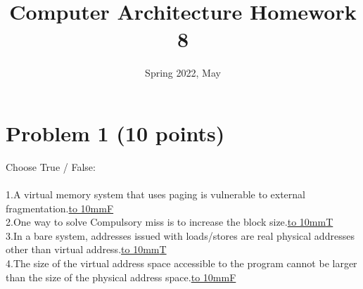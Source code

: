 \documentclass[answers]{exam}
\title{Computer Architecture Homework 8}
\date{Spring 2022, May}
\begin{document}
\maketitle

\section*{Problem 1 (10 points) }
Choose True / False:\\
\\1.A virtual memory system that uses paging is vulnerable to external fragmentation.\underline{\hbox to 10mm{F}}
\\2.One way to solve Compulsory miss is to increase the block size.\underline{\hbox to 10mm{T}}
\\3.In a bare system, addresses issued with loads/stores are real physical addresses other than virtual address.\underline{\hbox to 10mm{T}}
\\4.The size of the virtual address space accessible to the program cannot be larger than the size of the physical address space.\underline{\hbox to 10mm{F}}\\
\end{document}
